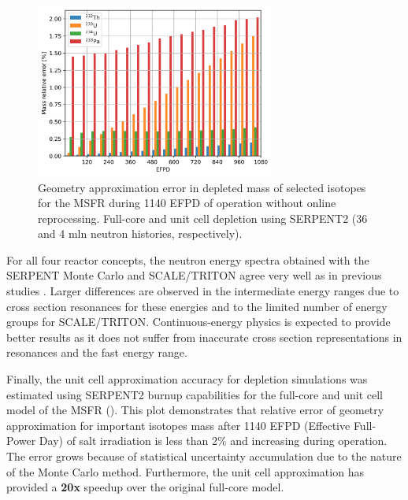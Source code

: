 \documentclass[letterpaper]{mandc2019}
\begin{document}
\begin{figure}[!htb]
  \centering
  \includegraphics[width=0.7\textwidth]{./Figures/msfr_depl_f_vs_u.png}
  	  \vspace{-0.1in}
  \caption{Geometry approximation error in depleted mass of selected isotopes for the \gls{MSFR} during 1140 EFPD of operation without online reprocessing. Full-core and unit cell depletion using SERPENT2 (36 and 4 mln neutron histories, respectively).}
  \label{fig:msfr_depl_err}
    \vspace{-0.4in}
\end{figure}
For all four reactor concepts, the neutron energy spectra obtained with the SERPENT Monte Carlo and SCALE/TRITON agree very well as in previous studies \cite{betzler_fuel_2018}. Larger differences are observed in the intermediate energy ranges due to cross section resonances for these energies and to the limited number of energy groups for SCALE/TRITON. Continuous-energy physics is expected to provide better results as it does not suffer from inaccurate cross section representations in resonances and the fast energy range. 

Finally, the unit cell approximation accuracy for depletion simulations was estimated using SERPENT2 burnup capabilities for the full-core and unit cell model of the \gls{MSFR} (). This plot demonstrates that relative error of geometry approximation for important isotopes mass after 1140 EFPD (Effective Full-Power Day) of salt irradiation is less than 2\% and increasing during operation. The error grows because of statistical uncertainty accumulation due to the nature of the Monte Carlo method. Furthermore, the unit cell approximation has provided a \textbf{20x} speedup over the original full-core model.
\end{document}
